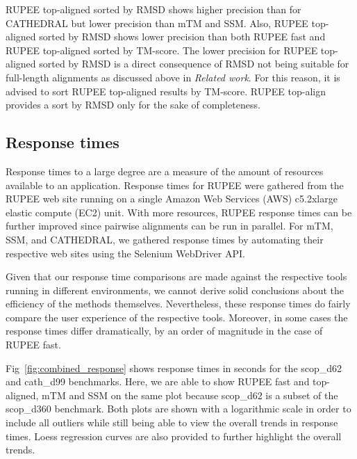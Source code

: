 \documentclass[10pt,letterpaper]{article}
\renewcommand{\figurename}{Fig}
\begin{document}
RUPEE top-aligned sorted by RMSD shows higher precision than for CATHEDRAL but lower precision than mTM and SSM. 
Also, RUPEE top-aligned sorted by RMSD shows lower precision than both RUPEE fast and RUPEE top-aligned sorted by TM-score.
The lower precision for RUPEE top-aligned sorted by RMSD is a direct consequence of RMSD not being suitable for full-length alignments as discussed above in \emph{Related work}.
For this reason, it is advised to sort RUPEE top-aligned results by TM-score. 
RUPEE top-align provides a sort by RMSD only for the sake of completeness.

\subsection*{Response times}

Response times to a large degree are a measure of the amount of resources available to an application. 
Response times for RUPEE were gathered from the RUPEE web site running on a single Amazon Web Services (AWS) c5.2xlarge elastic compute (EC2) unit. 
With more resources, RUPEE response times can be further improved since pairwise alignments can be run in parallel. 
For mTM, SSM, and CATHEDRAL, we gathered response times by automating their respective web sites using the Selenium WebDriver API. 

Given that our response time comparisons are made against the respective tools running in different environments, we cannot derive solid conclusions about the efficiency of the methods themselves. 
Nevertheless, these response times do fairly compare the user experience of the respective tools. 
Moreover, in some cases the response times differ dramatically, by an order of magnitude in the case of RUPEE fast. 

\figurename~\ref{fig:combined_response} shows response times in seconds for the scop\_d62 and cath\_d99 benchmarks. 
Here, we are able to show RUPEE fast and top-aligned, mTM and SSM on the same plot because scop\_d62 is a subset of the scop\_d360 benchmark. 
Both plots are shown with a logarithmic scale in order to include all outliers while still being able to view the overall trends in response times. 
Loess regression curves are also provided to further highlight the overall trends. 

\begin{figure*}[h!]
\caption{Response times for RUPEE fast and RUPEE top-aligned. The response times for RUPEE top-aligned are dominated by pairwise structure alignments and do not depend on the sort order.}
\label{fig:combined_response}
\end{figure*}
\end{document}
